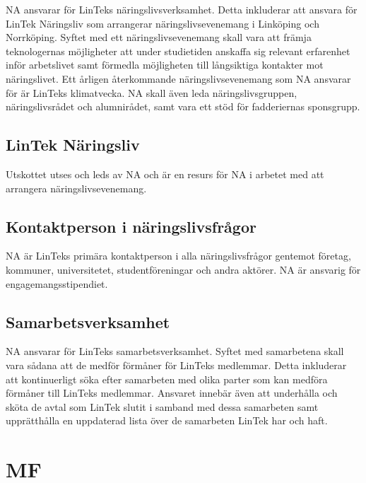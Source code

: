 NA ansvarar för LinTeks näringslivsverksamhet. Detta inkluderar att
ansvara för LinTek Näringsliv som arrangerar näringslivsevenemang i
Linköping och Norrköping. Syftet med ett näringslivsevenemang skall vara
att främja teknologernas möjligheter att under studietiden anskaffa sig
relevant erfarenhet inför arbetslivet samt förmedla möjligheten till
långsiktiga kontakter mot näringslivet. Ett årligen återkommande
näringslivsevenemang som NA ansvarar för är LinTeks klimatvecka. NA
skall även leda näringslivsgruppen, näringslivsrådet och alumnirådet,
samt vara ett stöd för fadderiernas sponsgrupp.

\hypertarget{lintek-nuxe4ringsliv}{%
\subsection{LinTek Näringsliv}\label{lintek-nuxe4ringsliv}}

Utskottet utses och leds av NA och är en resurs för NA i arbetet med att
arrangera näringslivsevenemang.

\hypertarget{kontaktperson-i-nuxe4ringslivsfruxe5gor}{%
\subsection{Kontaktperson i
näringslivsfrågor}\label{kontaktperson-i-nuxe4ringslivsfruxe5gor}}

NA är LinTeks primära kontaktperson i alla näringslivsfrågor gentemot
företag, kommuner, universitetet, studentföreningar och andra aktörer.
NA är ansvarig för engagemangsstipendiet.

\hypertarget{samarbetsverksamhet}{%
\subsection{Samarbetsverksamhet}\label{samarbetsverksamhet}}

NA ansvarar för LinTeks samarbetsverksamhet. Syftet med samarbetena
skall vara sådana att de medför förmåner för LinTeks medlemmar. Detta
inkluderar att kontinuerligt söka efter samarbeten med olika parter som
kan medföra förmåner till LinTeks medlemmar. Ansvaret innebär även att
underhålla och sköta de avtal som LinTek slutit i samband med dessa
samarbeten samt upprätthålla en uppdaterad lista över de samarbeten
LinTek har och haft.

\hypertarget{mf}{%
\section{MF}\label{mf}}

